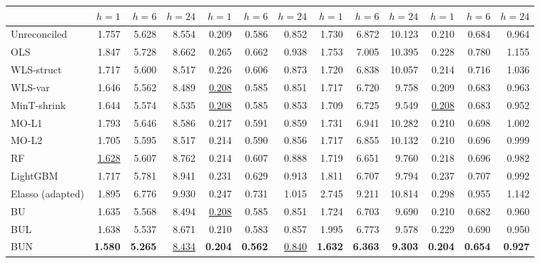 \begin{table}[!htbp]
\begin{tabular*}{\textwidth}{@{\extracolsep{\fill}}l*{12}{r}@{}}
\cmidrule(lr){2-4}\cmidrule(lr){5-7}\cmidrule(lr){8-10}\cmidrule(l){11-13}
 & $h=1$ & $h=6$ & $h=24$ & $h=1$ & $h=6$ & $h=24$ & $h=1$ & $h=6$ & $h=24$ & $h=1$ & $h=6$ & $h=24$ \\
\midrule
Unreconciled & 1.757 & 5.628 & 8.554 & 0.209 & 0.586 & 0.852 & 1.730 & 6.872 & 10.123 & 0.210 & 0.684 & 0.964 \\
OLS & 1.847 & 5.728 & 8.662 & 0.265 & 0.662 & 0.938 & 1.753 & 7.005 & 10.395 & 0.228 & 0.780 & 1.155 \\
WLS-struct & 1.717 & 5.600 & 8.517 & 0.226 & 0.606 & 0.873 & 1.720 & 6.838 & 10.057 & 0.214 & 0.716 & 1.036 \\
WLS-var & 1.646 & 5.562 & 8.489 & \cellcolor{accuracysecond}\underline{0.208} & 0.585 & 0.851 & 1.717 & 6.720 & 9.758 & 0.209 & 0.683 & 0.963 \\
MinT-shrink & 1.644 & 5.574 & 8.535 & \cellcolor{accuracysecond}\underline{0.208} & 0.585 & 0.853 & 1.709 & 6.725 & 9.549 & \cellcolor{accuracysecond}\underline{0.208} & 0.683 & 0.952 \\
MO-L1 & 1.793 & 5.646 & 8.586 & 0.217 & 0.591 & 0.859 & 1.731 & 6.941 & 10.282 & 0.210 & 0.698 & 1.002 \\
MO-L2 & 1.705 & 5.595 & 8.517 & 0.214 & 0.590 & 0.856 & 1.717 & 6.855 & 10.132 & 0.210 & 0.696 & 0.999 \\
RF & \cellcolor{accuracysecond}\underline{1.628} & 5.607 & 8.762 & 0.214 & 0.607 & 0.888 & 1.719 & 6.651 & 9.760 & 0.218 & 0.696 & 0.982 \\
LightGBM & 1.717 & 5.781 & 8.941 & 0.231 & 0.629 & 0.913 & 1.811 & 6.707 & 9.794 & 0.237 & 0.707 & 0.992 \\
Elasso (adapted) & 1.895 & 6.776 & 9.930 & 0.247 & 0.731 & 1.015 & 2.745 & 9.211 & 10.814 & 0.298 & 0.955 & 1.142 \\
\midrule
BU & 1.635 & 5.568 & 8.494 & \cellcolor{accuracysecond}\underline{0.208} & 0.585 & 0.851 & 1.724 & 6.703 & 9.690 & 0.210 & 0.682 & 0.960 \\
BUL & 1.638 & 5.537 & 8.671 & 0.210 & 0.583 & 0.857 & 1.995 & 6.773 & 9.578 & 0.229 & 0.690 & 0.950 \\
BUN & \cellcolor{accuracybest}\textbf{1.580} & \cellcolor{accuracybest}\textbf{5.265} & \cellcolor{accuracysecond}\underline{8.434} & \cellcolor{accuracybest}\textbf{0.204} & \cellcolor{accuracybest}\textbf{0.562} & \cellcolor{accuracysecond}\underline{0.840} & \cellcolor{accuracybest}\textbf{1.632} & \cellcolor{accuracybest}\textbf{6.363} & \cellcolor{accuracybest}\textbf{9.303} & \cellcolor{accuracybest}\textbf{0.204} & \cellcolor{accuracybest}\textbf{0.654} & \cellcolor{accuracybest}\textbf{0.927} \\

\end{tabular*}
\end{table}
